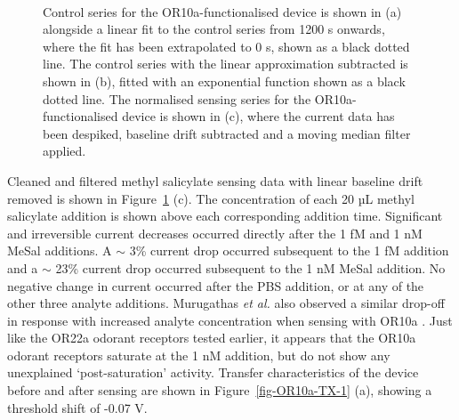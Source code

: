 \documentclass[
  a4paper,
]{scrbook}
\begin{document}
\begin{figure}
\begin{minipage}[t]{0.70\linewidth}
{{}

}

\end{minipage}%
%
\begin{minipage}[t]{0.15\linewidth}

{\centering 

~

}

\end{minipage}%

\caption{\label{fig-OR10a-sensing}Control series for the
OR10a-functionalised device is shown in (a) alongside a linear fit to
the control series from 1200 s onwards, where the fit has been
extrapolated to 0 s, shown as a black dotted line. The control series
with the linear approximation subtracted is shown in (b), fitted with an
exponential function shown as a black dotted line. The normalised
sensing series for the OR10a-functionalised device is shown in (c),
where the current data has been despiked, baseline drift subtracted and
a moving median filter applied.}

\end{figure}

Cleaned and filtered methyl salicylate sensing data with linear baseline
drift removed is shown in Figure~\ref{fig-OR10a-sensing} (c). The
concentration of each 20 µL methyl salicylate addition is shown above
each corresponding addition time. Significant and irreversible current
decreases occurred directly after the 1 fM and 1 nM MeSal additions. A
\(\sim\) 3\% current drop occurred subsequent to the 1 fM addition and a
\(\sim\) 23\% current drop occurred subsequent to the 1 nM MeSal
addition. No negative change in current occurred after the PBS addition,
or at any of the other three analyte additions. Murugathas \emph{et al.}
also observed a similar drop-off in response with increased analyte
concentration when sensing with OR10a \autocite{Murugathas2019a}. Just
like the OR22a odorant receptors tested earlier, it appears that the
OR10a odorant receptors saturate at the 1 nM addition, but do not show
any unexplained `post-saturation' activity. Transfer characteristics of
the device before and after sensing are shown in
Figure~\ref{fig-OR10a-TX-1} (a), showing a threshold shift of -0.07 V.
\end{document}
